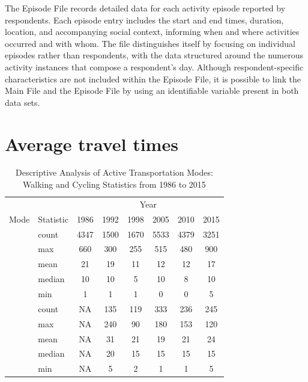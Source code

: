 \documentclass[Royal,times,sageh]{sagej}
\begin{document}
The Episode File records detailed data for each activity episode
reported by respondents. Each episode entry includes the start and end
times, duration, location, and accompanying social context, informing
when and where activities occurred and with whom. The file distinguishes
itself by focusing on individual episodes rather than respondents, with
the data structured around the numerous activity instances that compose
a respondent's day. Although respondent-specific characteristics are not
included within the Episode File, it is possible to link the Main File
and the Episode File by using an identifiable variable present in both
data sets.

\hypertarget{average-travel-times}{%
\section{Average travel times}\label{average-travel-times}}

\begingroup\fontsize{10}{12}\selectfont

\begin{longtable}[t]{>{}llcccccc}
\caption{\label{tab:ch03-make-table-01}\label{tab:ch03-table-01}Descriptive Analysis of Active Transportation Modes: Walking and Cycling Statistics from 1986 to 2015}\\
\toprule
\multicolumn{2}{c}{ } & \multicolumn{6}{c}{Year} \\
\cmidrule(l{3pt}r{3pt}){3-8}
Mode & Statistic & 1986 & 1992 & 1998 & 2005 & 2010 & 2015\\
\midrule
 & count & 4347 & 1500 & 1670 & 5533 & 4379 & 3251\\
\nopagebreak
 & max & 660 & 300 & 255 & 515 & 480 & 900\\
\nopagebreak
 & mean & 21 & 19 & 11 & 12 & 12 & 17\\
\nopagebreak
 & median & 10 & 10 & 5 & 10 & 8 & 10\\
\nopagebreak
\multirow[t]{-5}{*}{\raggedright\arraybackslash \textbf{Walking}} & min & 1 & 1 & 1 & 0 & 0 & 5\\
\cmidrule{1-8}\pagebreak[0]
 & count & NA & 135 & 119 & 333 & 236 & 245\\
\nopagebreak
 & max & NA & 240 & 90 & 180 & 153 & 120\\
\nopagebreak
 & mean & NA & 31 & 21 & 19 & 21 & 24\\
\nopagebreak
 & median & NA & 20 & 15 & 15 & 15 & 15\\
\nopagebreak
\multirow[t]{-5}{*}{\raggedright\arraybackslash \textbf{Cycling}} & min & NA & 5 & 2 & 1 & 1 & 5\\
\bottomrule
\end{longtable}
\endgroup{}
\end{document}
